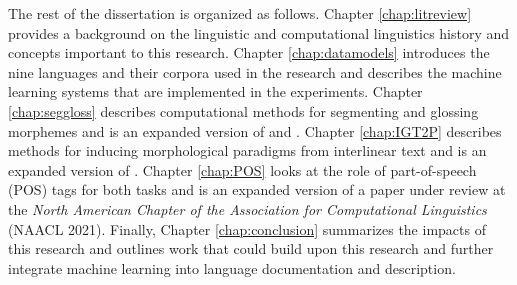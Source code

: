 
The rest of the dissertation is organized as follows. Chapter \ref{chap:litreview} provides a background on the linguistic and computational linguistics history and concepts important to this research.
Chapter \ref{chap:datamodels} introduces the nine languages and their corpora used in the research and describes the machine learning systems that are implemented in the experiments.
Chapter \ref{chap:seggloss} describes computational methods for segmenting and glossing morphemes and is an expanded version of \citet{moeller_automatic_2018} and \citet{moeller_integrating_2021}. Chapter \ref{chap:IGT2P} describes methods for inducing morphological paradigms from interlinear text and is an expanded version of \citet{moeller_igt2p_2020}. Chapter \ref{chap:POS} looks at the role of part-of-speech (POS) tags for both tasks and is an expanded version of a paper under review at the \textit{North American Chapter of the Association for Computational Linguistics} (NAACL 2021). Finally, Chapter \ref{chap:conclusion} summarizes the impacts of this research and outlines work that could build upon this research and further integrate machine learning into language documentation and description.